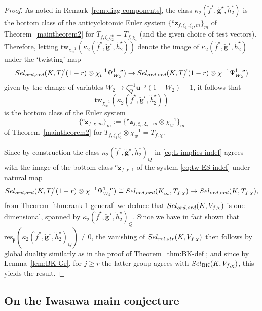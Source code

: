 \documentclass[10pt,letterpaper]{amsart}
\theoremstyle{plain}
\theoremstyle{definition}
\theoremstyle{definition}
\theoremstyle{plain}
\theoremstyle{plain}
\theoremstyle{plain}
\theoremstyle{remark}
\numberwithin{equation}{section}
\newcommand{\cc}{\mathbf{c}}
\newcommand{\Sel}{Sel}
\newcommand{\ppbar}{\bar{\mathfrak{p}}}
\newcommand{\relstr}{{{\rm rel},{\rm str}}}
\newcommand{\ord}{{{\rm ord},{\rm ord}}}
\def\Sel{{\rm Sel}}
\newcommand{\bfg}{{\boldsymbol{g}}}
\begin{document}
\begin{proof}
As noted in Remark~\ref{rem:diag-components}, the class  $\kappa_2(\breve{f}^\star,\breve{\bfg}^\star,\breve{h}_2^\star)$ is the bottom class of the anticyclotomic Euler system $\{ {}^\cc\mathbf{z}_{f,\xi_1,\xi_2,m}\}_m$ of Theorem~\ref{maintheorem2} for $T_{f,\xi_1\xi_2^\cc}=T_{f,\chi_t}$ (and the given choice of test vectors). Therefore, letting ${\mathrm{tw}}_{\chi_w^{-1}}(\kappa_2(\breve{f}^\star,\breve{\bfg}^\star,\breve{h}_2^\star))$ denote the image of $\kappa_2(\breve{f}^\star,\breve{\bfg}^\star,\breve{h}^\star_2)$ under the `twisting' map
\[
\Sel_{\ord}(K,T_f^{\vee}(1-r)\otimes\chi_t^{-1}\Psi_{W_2}^{1-\cc})\rightarrow\Sel_{\ord}(K,T_f^{\vee}(1-r)\otimes\chi^{-1}\Psi_{W_2}^{1-\cc})
\]
given by the change of variables $W_2\mapsto\zeta_Q^{-1}\mathbf{u}^{-j}(1+W_2)-1$, it follows that \[{\mathrm{tw}}_{\chi_w^{-1}}(\kappa_2(\breve{f}^\star,\breve{\bfg}^\star,\breve{h}_2^\star))\] is the bottom class of the Euler system 
\begin{equation}\label{eq:tw-ES-indef}
\bigl\{{}^\cc\mathbf{z}_{f,\chi,m}\bigr\}_m:=\bigl\{ {}^\cc\mathbf{z}_{f,\xi_1,\xi_2,,m}\otimes\chi_w^{-1}\bigr\}_m
\end{equation}
of Theorem~\ref{maintheorem2} for $T_{f,\xi_1\xi_2^\cc}\otimes\chi_w^{-1}=T_{f,\chi}$. 

Since by construction the class   $\kappa_2(\breve{f}^\star,\breve{\bfg}^\star,\breve{h}_2^\star)_Q$ in \eqref{eq:L-implies-indef} agrees with the image of the bottom class ${}^\cc\mathbf{z}_{f,\chi,1}$ of the system \eqref{eq:tw-ES-indef} under natural map
\[
\Sel_{\ord}(K,T_f^{\vee}(1-r)\otimes\chi^{-1}\Psi_{W_2}^{1-\cc})\cong\Sel_{\ord}(K_\infty^-,T_{f,\chi})\rightarrow\Sel_{\ord}(K,T_{f,\chi}),
\]
from Theorem~\ref{thm:rank-1-general} 
we deduce that $\Sel_{\ord}(K,V_{f,\chi})$ is one-dimensional, spanned by $\kappa_2(\breve{f}^\star,\breve{\bfg}^\star,\breve{h}_2^\star)_Q$. 
Since we have in fact shown that ${\mathrm{res}}_{\ppbar}(\kappa_2(\breve{f}^\star,\breve{\bfg}^\star,\breve{h}_2^\star)_Q)\neq 0$, the vanishing of $\Sel_{\relstr}(K,V_{f,\chi})$ then follows by global duality similarly as in the proof of Theorem~\ref{thm:BK-def}; and since by Lemma~\ref{lem:BK-Gr}, for $j\geq r$ the latter group agrees with $\Sel_{\mathrm{BK}}(K,V_{f,\chi})$, this yields the result.
\end{proof}


\subsection{On the Iwasawa main conjecture}
\label{subsec:IMC-indef}
\end{document}
